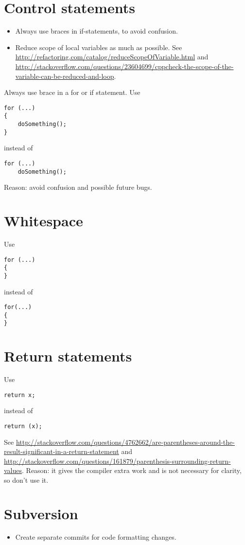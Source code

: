 \documentclass{article}
\begin{document}
\section{Control statements}

\begin{itemize}
\item Always use braces in if-statements, to avoid confusion.
\item Reduce scope of local variables as much as possible.  See \url{http://refactoring.com/catalog/reduceScopeOfVariable.html} and \url{http://stackoverflow.com/questions/23604699/cppcheck-the-scope-of-the-variable-can-be-reduced-and-loop}.
\end{itemize}

Always use brace in a for or if statement.  Use
\begin{lstlisting}
for (...)
{
    doSomething();
}
\end{lstlisting}
instead of
\begin{lstlisting}
for (...)
    doSomething();
\end{lstlisting}
Reason: avoid confusion and possible future bugs.

\section{Whitespace}
Use
\begin{lstlisting}
for (...)
{
}
\end{lstlisting}
instead of
\begin{lstlisting}
for(...)
{
}
\end{lstlisting}


\section{Return statements}

Use
\begin{lstlisting}
return x;
\end{lstlisting}
instead of
\begin{lstlisting}
return (x);
\end{lstlisting}
See \url{http://stackoverflow.com/questions/4762662/are-parentheses-around-the-result-significant-in-a-return-statement} and \url{http://stackoverflow.com/questions/161879/parenthesis-surrounding-return-values}.
Reason: it gives the compiler extra work and is not necessary for clarity, so don't use it.

\section{Subversion}

\begin{itemize}
	\item Create separate commits for code formatting changes.
\end{itemize}
\end{document}
